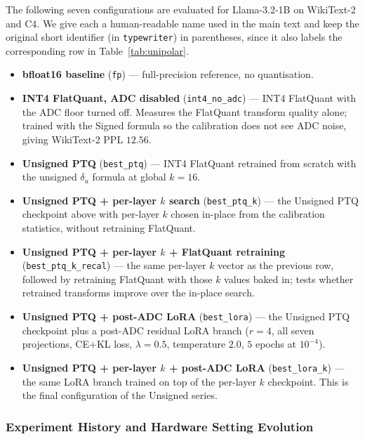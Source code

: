 \documentclass[a4paper,11pt,oneside]{article}
\theoremstyle{breakstyle}
\begin{document}
  The following seven configurations are evaluated for
  Llama-3.2-1B on WikiText-2 and C4.  We give each a
  human-readable name used in the main text and keep the original
  short identifier (in \texttt{typewriter}) in parentheses, since
  it also labels the corresponding row in Table~\ref{tab:unipolar}.
  \begin{itemize}
    \item \textbf{bfloat16 baseline} (\texttt{fp}) --- full-precision
      reference, no quantisation.
    \item \textbf{INT4 FlatQuant, ADC disabled} (\texttt{int4\_no\_adc})
      --- INT4 FlatQuant with the ADC floor turned off.  Measures the
      FlatQuant transform quality alone; trained with the Signed
      formula so the calibration does not see ADC noise, giving
      WikiText-2 PPL $12.56$.
    \item \textbf{Unsigned PTQ} (\texttt{best\_ptq}) --- INT4
      FlatQuant retrained from scratch with the unsigned $\delta_u$
      formula at global $k = 16$.
    \item \textbf{Unsigned PTQ + per-layer $k$ search}
      (\texttt{best\_ptq\_k}) --- the Unsigned PTQ checkpoint above
      with per-layer $k$ chosen in-place from the calibration
      statistics, without retraining FlatQuant.
    \item \textbf{Unsigned PTQ + per-layer $k$ + FlatQuant retraining}
      (\texttt{best\_ptq\_k\_recal}) --- the same per-layer $k$
      vector as the previous row, followed by retraining FlatQuant
      with those $k$ values baked in; tests whether retrained
      transforms improve over the in-place search.
    \item \textbf{Unsigned PTQ + post-ADC LoRA} (\texttt{best\_lora})
      --- the Unsigned PTQ checkpoint plus a post-ADC residual LoRA
      branch ($r = 4$, all seven projections, CE$+$KL loss,
      $\lambda = 0.5$, temperature $2.0$, $5$ epochs at $10^{-4}$).
    \item \textbf{Unsigned PTQ + per-layer $k$ + post-ADC LoRA}
      (\texttt{best\_lora\_k}) --- the same LoRA branch trained on
      top of the per-layer $k$ checkpoint.  This is the final
      configuration of the Unsigned series.
  \end{itemize}

  \subsubsection{Experiment History and Hardware Setting Evolution}
\end{document}
